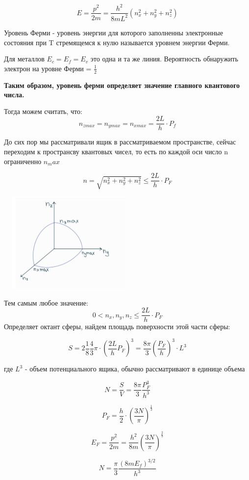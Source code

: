 \documentclass[../main.tex]{subfiles}
\begin{document}
\[E = \frac{p^2}{2m} = \frac{h^2}{8mL^2}(n_x^2 + n_y^2+n_z^2)\]

 Уровень Ферми - уровень энергии для которого заполненны электронные состояния  при T стремящемся к нулю называется уровнем энергии Ферми.

Для металлов $E_c = E_f = E_v$ это одна и та же линия. Вероятность обнаружить электрон на уровне Ферми = $\frac{1}{2}$

\textbf{Таким образом, уровень ферми определяет значение главного квантового числа.}

Тогда можем считать, что:
\[n_{zmax} = n_{ymax} = n_{xmax} = \frac{2L}{h} \cdot P_f\]

До сих пор мы рассматривали ящик в рассматриваемом пространстве, сейчас переходим к пространсву квантовых чисел, то есть 
по каждой оси число n ограниченно $n_max$

\[n = \sqrt{n^2_x+n^2_y+n^2_z} \leq \frac{2L}{h} \cdot P_F\]

\begin{center}
    \includegraphics[height=5cm, width=7cm]{../img/kvantovy9.png}
\end{center}

Тем самым любое значение: 
\[0 < n_x, n_y,n_z \leq \frac{2L}{h} \cdot P_F\]
Определяет октант сферы, найдем площадь поверхности этой части сферы:

\[S = 2 \frac{1}{8} \frac{4}{3} \pi \cdot (\frac{2L}{h} P_F)^3 = \frac{8 \pi}{3} (\frac{P_F}{h})^3 \cdot L^3\]
\begin{center}
    где $L^3$ - объем потенциального ящика, обычно рассматривают в единице объема    
\end{center}

\[N = \frac{S}{V} = \frac{8 \pi}{3} \frac{P_F^3}{h^3}\]

\[P_F = \frac{h}{2} \cdot (\frac{3N}{\pi})^{\frac{1}{3}}\]

\[E_F = \frac{p^2}{2m} = \frac{h^2}{8m}(\frac{3N}{\pi})^{\frac{2}{3}}\]

\[N = \frac{\pi}{3} \frac{(8mE_f)^{3/2}}{h^3}\]
\end{document}
